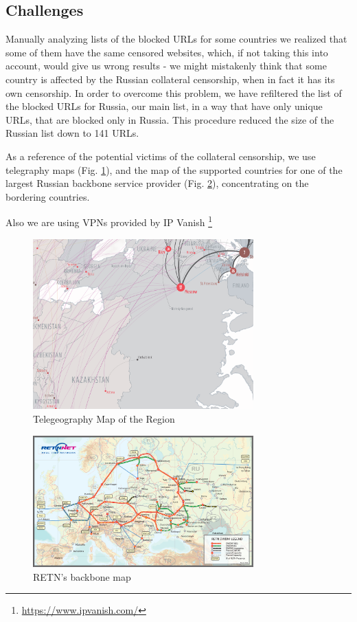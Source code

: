 \documentclass[conference]{IEEEtran}
\begin{document}
\subsection{Challenges}
Manually analyzing lists of the blocked URLs for some countries we realized that some of them have the same censored websites, which, if not taking this into account, would give us wrong results - we might mistakenly think that some country is affected by the Russian collateral censorship, when in fact it has its own censorship. In order to overcome this problem, we have refiltered the list of the blocked URLs for Russia, our main list, in a way that have only unique URLs, that are blocked only in Russia. This procedure reduced the size of the Russian list down to 141 URLs. 

As a reference of the potential victims of the collateral censorship, we use telegraphy maps (Fig. \ref{fig:fig3}), and the map of the supported countries for one of the largest Russian backbone service provider (Fig. \ref{fig:fig2}), concentrating on the bordering countries. 

Also we are using VPNs provided by IP Vanish
\footnote{\url{https://www.ipvanish.com/}}

\begin{figure}[H]
    \centering
    \includegraphics[width=85mm]{routeMap.png}
    \caption{Telegeography Map of the Region \label{teleG}}
    \label{fig:fig3}
\end{figure}

\begin{figure}[H]
    \centering
    \includegraphics[width=85mm]{figure2.png}
    \caption{RETN's backbone map \label{RetnMap}}
    \label{fig:fig2}
\end{figure}
\end{document}
